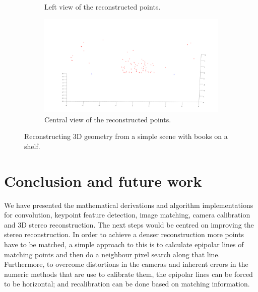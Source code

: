 \documentclass[12pt]{article}
\begin{document}
\begin{figure}[htbp]
\begin{subfigure}[b]{0.45\textwidth}
                \caption{Left view of the reconstructed points.}
                \label{fig:stereoRecons2}
        \end{subfigure}
        \begin{subfigure}[b]{0.45\textwidth}
                \includegraphics[width=\textwidth]{images/reconstruction2}
                \caption{Central view of the reconstructed points.}
                \label{fig:stereoRecons3}
        \end{subfigure}
        \caption{Reconstructing 3D geometry from a simple scene with books on a shelf.}\label{fig:stereoReconstruction}
\end{figure}

\FloatBarrier
\section{Conclusion and future work}

We have presented the mathematical derivations and algorithm implementations for convolution, keypoint feature detection, image matching, camera calibration and 3D stereo reconstruction.
The next steps would be centred on improving the stereo reconstruction.
In order to achieve a denser reconstruction more points have to be matched, a simple approach to this is to calculate epipolar lines of matching points and then do a neighbour pixel search along that line.
Furthermore, to overcome distortions in the cameras and inherent errors in the numeric methods that are use to calibrate them, the epipolar lines can be forced to be horizontal; and recalibration can be done based on matching information.



\end{document}
